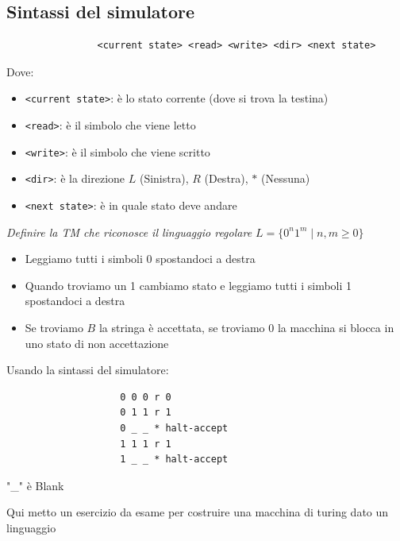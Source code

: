 \documentclass[12pt, a4paper]{report}
\begin{document}
            \subsection{Sintassi del simulatore}
            \begin{verbatim}
                <current state> <read> <write> <dir> <next state>
            \end{verbatim}
            \vspace{-1cm}
            Dove: \begin{itemize}
                \item \texttt{<current state>}: è lo stato corrente (dove si trova la testina)
                \item \texttt{<read>}: è il simbolo che viene letto
                \item \texttt{<write>}: è il simbolo che viene scritto
                \item \texttt{<dir>}: è la direzione $L$ (Sinistra), $R$ (Destra), $*$ (Nessuna)
                \item \texttt{<next state>}: è in quale stato deve andare
            \end{itemize}
            \begin{example}
                \textit{Definire la TM che riconosce il linguaggio regolare $L=\{0^n1^m\mid n,m\geq 0\}$}
                \begin{itemize}
                    \item Leggiamo tutti i simboli 0 spostandoci a destra
                    \item Quando troviamo un 1 cambiamo stato e leggiamo tutti i simboli 1 spostandoci a destra
                    \item Se troviamo $B$ la stringa è accettata, se troviamo 0 la macchina si blocca in uno stato di non accettazione
                \end{itemize}
                Usando la sintassi del simulatore:
                \begin{verbatim}
                    0 0 0 r 0
                    0 1 1 r 1
                    0 _ _ * halt-accept
                    1 1 1 r 1
                    1 _ _ * halt-accept
                \end{verbatim}
                "\_" è Blank
            \end{example}
            \begin{exercise}
                Qui metto un esercizio da esame per costruire una macchina di turing dato un linguaggio
            \end{exercise}        
\end{document}
